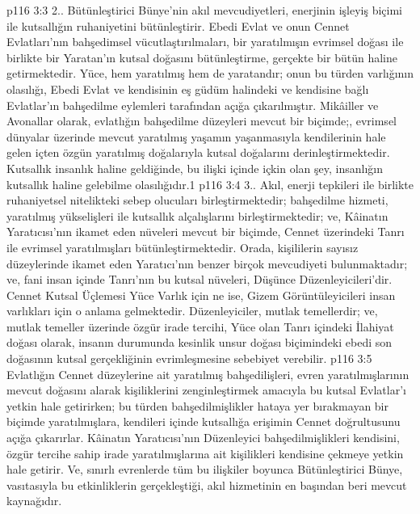 \vs p116 3:3 2.. Bütünleştirici Bünye’nin akıl mevcudiyetleri, enerjinin işleyiş biçimi ile kutsallığın ruhaniyetini bütünleştirir. Ebedi Evlat ve onun Cennet Evlatları’nın bahşedimsel vücutlaştırılmaları, bir yaratılmışın evrimsel doğası ile birlikte bir Yaratan’ın kutsal doğasını bütünleştirme, gerçekte bir bütün haline getirmektedir. Yüce, hem yaratılmış hem de yaratandır; onun bu türden varlığının olasılığı, Ebedi Evlat ve kendisinin eş güdüm halindeki ve kendisine bağlı Evlatlar’ın bahşedilme eylemleri tarafından açığa çıkarılmıştır. Mikâiller ve Avonallar olarak, evlatlığın bahşedilme düzeyleri mevcut bir biçimde;, evrimsel dünyalar üzerinde mevcut yaratılmış yaşamın yaşanmasıyla kendilerinin hale gelen içten özgün yaratılmış doğalarıyla kutsal doğalarını derinleştirmektedir. Kutsallık insanlık haline geldiğinde, bu ilişki içinde içkin olan şey, insanlığın kutsallık haline gelebilme olasılığıdır.1
\vs p116 3:4 3.\bibnobreakspace {}. Akıl, enerji tepkileri ile birlikte ruhaniyetsel nitelikteki sebep olucuları birleştirmektedir; bahşedilme hizmeti, yaratılmış yükselişleri ile kutsallık alçalışlarını birleştirmektedir; ve, Kâinatın Yaratıcısı’nın ikamet eden nüveleri mevcut bir biçimde, Cennet üzerindeki Tanrı ile evrimsel yaratılmışları bütünleştirmektedir. Orada, kişililerin sayısız düzeylerinde ikamet eden Yaratıcı’nın benzer birçok mevcudiyeti bulunmaktadır; ve, fani insan içinde Tanrı’nın bu kutsal nüveleri, Düşünce Düzenleyicileri’dir. Cennet Kutsal Üçlemesi Yüce Varlık için ne ise, Gizem Görüntüleyicileri insan varlıkları için o anlama gelmektedir. Düzenleyiciler, mutlak temellerdir; ve, mutlak temeller üzerinde özgür irade tercihi, Yüce olan Tanrı içindeki İlahiyat doğası olarak, insanın durumunda kesinlik unsur doğası biçimindeki ebedi son doğasının kutsal gerçekliğinin evrimleşmesine sebebiyet verebilir.
\vs p116 3:5 Evlatlığın Cennet düzeylerine ait yaratılmış bahşedilişleri, evren yaratılmışlarının mevcut doğasını alarak kişiliklerini zenginleştirmek amacıyla bu kutsal Evlatlar’ı yetkin hale getirirken; bu türden bahşedilmişlikler hataya yer bırakmayan bir biçimde yaratılmışlara, kendileri içinde kutsallığa erişimin Cennet doğrultusunu açığa çıkarırlar. Kâinatın Yaratıcısı’nın Düzenleyici bahşedilmişlikleri kendisini, özgür tercihe sahip irade yaratılmışlarına ait kişilikleri kendisine çekmeye yetkin hale getirir. Ve, sınırlı evrenlerde tüm bu ilişkiler boyunca Bütünleştirici Bünye, vasıtasıyla bu etkinliklerin gerçekleştiği, akıl hizmetinin en başından beri mevcut kaynağıdır.
